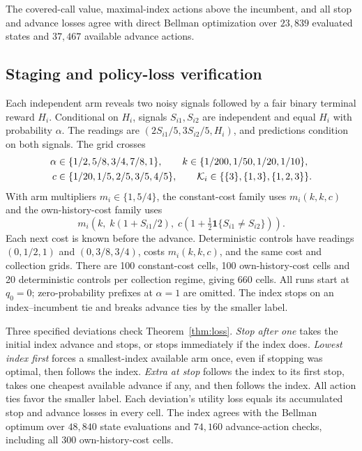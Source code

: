 The covered-call value, maximal-index actions above the incumbent, and all
stop and advance losses agree with direct Bellman optimization over
$23{,}839$ evaluated states and $37{,}467$ available advance actions.

\subsection{Staging and policy-loss verification}
\label{app:staging-results}

Each independent arm reveals two noisy signals followed by a fair binary
terminal reward $H_i$. Conditional on $H_i$, signals $S_{i1},S_{i2}$ are
independent and equal $H_i$ with probability $\alpha$. The readings are
$(2S_{i1}/5,3S_{i2}/5,H_i)$, and predictions condition on both signals.
The grid crosses
\[
\begin{split}
 \alpha&\in\{1/2,5/8,3/4,7/8,1\},\qquad
 k\in\{1/200,1/50,1/20,1/10\},\\
 c&\in\{1/20,1/5,2/5,3/5,4/5\},\qquad
 \mathcal{K}_i\in\{\{3\},\{1,3\},\{1,2,3\}\}.
\end{split}
\]
With arm multipliers $m_i\in\{1,5/4\}$, the constant-cost family uses
$m_i(k,k,c)$ and the own-history-cost family uses
\[
 m_i\left(k,\;k(1+S_{i1}/2),\;
 c\left(1+\tfrac12\mathbf 1\{S_{i1}\ne S_{i2}\}\right)\right).
\]
Each next cost is known before the advance. Deterministic controls have readings
$(0,1/2,1)$ and $(0,3/8,3/4)$, costs $m_i(k,k,c)$, and the same cost and
collection grids. There are 100 constant-cost cells, 100 own-history-cost cells
and 20 deterministic controls per collection regime, giving 660 cells.
All runs start at $q_0=0$; zero-probability prefixes at $\alpha=1$ are omitted.
The index stops on an index--incumbent tie and breaks advance ties by the smaller label.

Three specified deviations check Theorem~\ref{thm:loss}.
\emph{Stop after one} takes the initial index advance and stops, or stops immediately
if the index does. \emph{Lowest index first} forces a smallest-index available arm
once, even if stopping was optimal, then follows the index.
\emph{Extra at stop} follows the index to its first stop, takes one cheapest
available advance if any, and then follows the index. All action ties favor
the smaller label. Each deviation's utility loss equals its accumulated stop
and advance losses in every cell. The index agrees with the Bellman optimum
over $48{,}840$ state evaluations and $74{,}160$ advance-action checks,
including all 300 own-history-cost cells.

